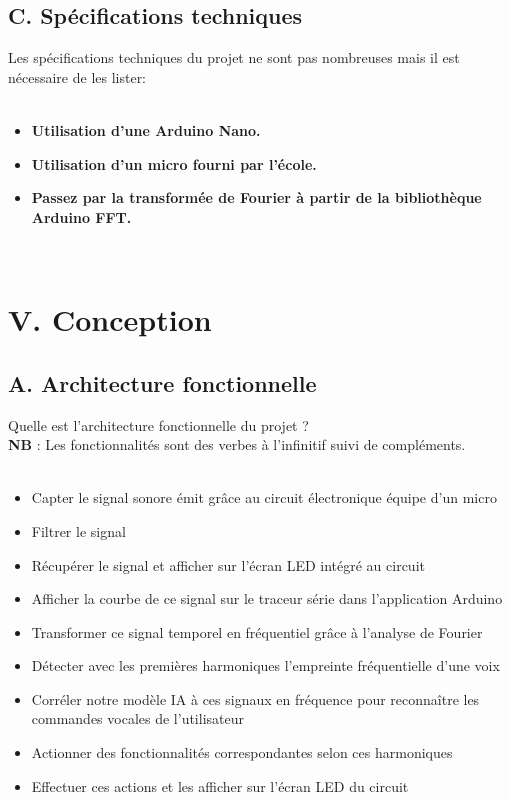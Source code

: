 \documentclass[a4paper,11pt]{book}
\begin{document}
\subsection*{C. Spécifications techniques}
Les spécifications techniques du projet ne sont pas nombreuses mais il est nécessaire de les lister: \\ \\
\begin{itemize}
        \item \textbf{Utilisation d'une Arduino Nano.}
        \item \textbf{Utilisation d'un micro fourni par l'école.}
        \item \textbf{Passez par la transformée de Fourier à partir de la bibliothèque Arduino FFT.} 
\end{itemize}
\\

\newpage
\section*{V. Conception}
\subsection*{A. Architecture fonctionnelle}
Quelle est l’architecture fonctionnelle du projet ? \\
\noindent \textbf{NB} : Les fonctionnalités sont des verbes à l’infinitif suivi de compléments.\\ \\
\begin{itemize}
        \item Capter le signal sonore émit grâce au circuit électronique équipe d'un micro
\indent \item Filtrer le signal
\indent \item Récupérer le signal et afficher sur l'écran LED intégré au circuit 
\indent \item Afficher la courbe de ce signal sur le traceur série dans l'application Arduino 
\indent \item Transformer ce signal temporel en fréquentiel grâce à l'analyse de Fourier 
\indent \item Détecter avec les premières harmoniques l'empreinte fréquentielle d'une voix
\indent \item Corréler notre modèle IA à ces signaux en fréquence pour reconnaître les commandes vocales de l'utilisateur 
\indent \item Actionner des fonctionnalités correspondantes selon ces harmoniques 
\indent \item Effectuer ces actions et les afficher sur l'écran LED du circuit 
\end{itemize}
\end{document}
